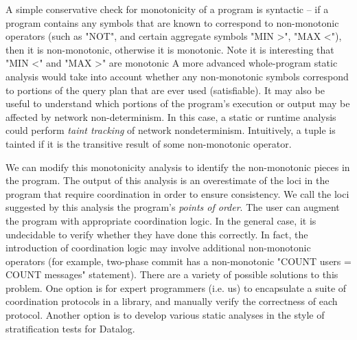 A simple conservative check for monotonicity of a program is syntactic -- if a
program contains any symbols that are known to correspond to non-monotonic
operators (such as "NOT", and certain aggregate symbols "MIN >", "MAX <"), then
it is non-monotonic, otherwise it is monotonic.  Note it is interesting that
"MIN <" and "MAX >" are monotonic   A more advanced
whole-program static analysis would take into account whether any non-monotonic
symbols correspond to portions of the query plan that are ever used
(satisfiable).  It may also be useful to understand which portions of the
program's execution or output may be affected by network non-determinism.  In
this case, a static or runtime analysis could perform {\em taint tracking} of
network nondeterminism.  Intuitively, a tuple is tainted if it is the
transitive result of some non-monotonic operator.

We can modify this monotonicity analysis to identify the non-monotonic pieces
in the program.  The output of this analysis is an overestimate of the loci in
the program that require coordination in order to ensure consistency.  We call
the loci suggested by this analysis the program's {\em points of order}.  The
user can augment the program with appropriate coordination logic.  In the
general case, it is undecidable to verify whether they have done this
correctly.  In fact, the introduction of coordination logic may involve
additional non-monotonic operators (for example, two-phase commit has a
non-monotonic "COUNT users = COUNT messages" statement).  There are a variety
of possible solutions to this problem.  One option is for expert programmers
(i.e. us) to encapsulate a suite of coordination protocols in a library, and
manually verify the correctness of each protocol.  Another option is to develop
various static analyses in the style of stratification tests for Datalog.

    

